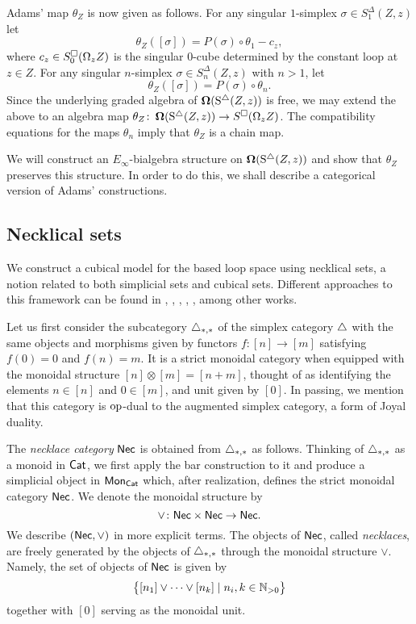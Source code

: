 Adams' map $\theta_Z$ is now given as follows.
For any singular $1$-simplex $\sigma \in S^{\Delta}_1(Z, z)$ let
$$\theta_Z([\sigma])= P(\sigma) \circ \theta_1 - c_z,$$
where $c_z \in S^{\square}_0(\Omega_z Z)$ is the singular $0$-cube determined by the constant loop at $z \in Z.$ For any singular $n$-simplex $\sigma \in S^{\Delta}_n(Z, z)$ with $n>1$, let
$$\theta_Z([\sigma])= P(\sigma) \circ \theta_n.$$ Since the underlying graded algebra of $\operatorname{\mathbf{\Omega}}(\operatorname{S^{\triangle}}(Z, z))$ is free, we may extend the above to an algebra map $\theta_Z \colon \operatorname{\mathbf{\Omega}}(\operatorname{S^{\triangle}}(Z, z)) \to S^{\square}(\Omega_z Z)$.
The compatibility equations for the maps $\theta_n$ imply that $\theta_Z$ is a chain map.

We will construct an $E_{\infty}$-bialgebra structure on $\operatorname{\mathbf{\Omega}}(\operatorname{S^{\triangle}}(Z, z))$ and show that $\theta_Z$ preserves this structure.
In order to do this, we shall describe a categorical version of Adams' constructions.

\subsection{Necklical sets}

We construct a cubical model for the based loop space using necklical sets, a notion related to both simplicial sets and cubical sets.
Different approaches to this framework can be found in \cite{baues1998hopf}, \cite{galvez2020hopf}, \cite{dugger2011rigidification}, \cite{rivera2018cubical}, \cite{rivera2019path}, among other works.

Let us first consider the subcategory $\triangle_{*,*}$ of the simplex category $\triangle$ with the same objects and morphisms given by functors $f \colon [n] \to [m]$ satisfying $f(0) = 0$ and $f(n) = m$.
It is a strict monoidal category when equipped with the monoidal structure $[n] \otimes [m] = [n+m]$, thought of as identifying the elements $n \in [n]$ and $0 \in [m]$, and unit given by $[0]$.
In passing, we mention that this category is $\mathrm{op}$-dual to the augmented simplex category, a form of Joyal duality.

The \textit{necklace category} $\mathsf{Nec}$ is obtained from $\triangle_{*,*}$ as follows.
Thinking of $\triangle_{*,*}$ as a monoid in $\mathsf{Cat}$, we first apply the bar construction to it and produce a simplicial object in $\mathsf{Mon}_{\mathsf{Cat}}$ which, after realization, defines the strict monoidal category $\mathsf{Nec}$. We denote the monoidal structure by 
\[\vee \colon \mathsf{Nec} \times \mathsf{Nec} \to \mathsf{Nec}.\]
We describe $(\mathsf{Nec}, \vee)$ in more explicit terms. The objects of $\mathsf{Nec}$, called \textit{necklaces}, are freely generated by the objects of $\triangle_{*,*}$ through the monoidal structure $\vee$. Namely, the set of objects of $\mathsf{Nec}$ is given by
\begin{equation*}
\big\{ [n_1] \vee \cdots \vee[n_k] \mid n_i, k \in \mathbb{N}_{>0} \big\}
\end{equation*}
together with $[0]$ serving as the monoidal unit. 

